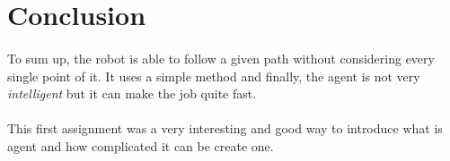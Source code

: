 \section*{Conclusion}

\paragraph{}{
    To sum up, the robot is able to follow a given path without considering 
 every single point of it. It uses a simple method and finally, the agent is not
 very \textit{intelligent} but it can make the job quite fast.
}

\paragraph{}{
    This first assignment was a very interesting and good way to introduce what 
 is agent and how complicated it can be create one.
}
